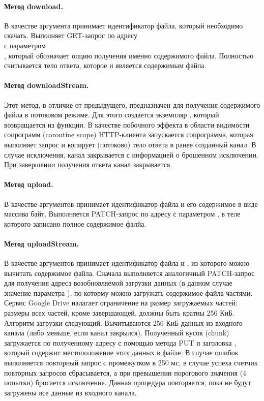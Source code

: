         \paragraph{Метод download.} В качестве аргумента принимает идентификатор файла, который необходимо скачать. Выполняет GET-запрос по адресу\\  с параметром\\ , который обозначает опцию получения именно содержимого файла. Полностью считывается тело ответа, которое и является содержимым файла.

        \paragraph{Метод downloadStream.} Этот метод, в отличие от предыдущего, предназначен для получения содержимого файла в потоковом режиме. Для этого создается экземпляр , который возвращается из функции. В качестве побочного эффекта в области видимости сопрограмм (coroutine scope) HTTP-клиента запускается сопрограмма, которая выполняет запрос и копирует (потоково) тело ответа в ранее созданный канал. В случае исключения, канал закрывается с информацией о брошенном исключении. При завершении получения ответа канал закрывается.

        \paragraph{Метод upload.} В качестве аргументов принимает идентификатор файла и его содержимое в виде массива байт. Выполняется PATCH-запрос по адресу  с параметром , в теле которого записано полное содержимое фалйа.

        \paragraph{Метод uploadStream.} В качестве аргументов принимает идентификатор файла и , из которого можно вычитать содержимое файла. Сначала выполняется аналогичный PATCH-запрос для получения адреса возобновляемой загрузки данных (в данном случае значение параметра ), по которму можно загружать содержимое файла частями. Сервис Google Drive налагает ограничение на размер загружаемых частей: размеры всех частей, кроме завершающей, должны быть кратны 256 КиБ. Алгоритм загрузки следующий. Вычитываются 256 КиБ данных из входного канала (либо меньше, если канал закрылся). Полученный кусок (chunk) загружается по полученному адресу с помощью метода PUT и заголовка , который содержит местоположение этих данных в файле. В случае ошибок выполняется повторный запрос с промежутком в 250 мс, в случае успеха счетчик повторных запросов сбрасывается, а при превышении порогового значения (4 попытки) бросается исключение. Данная процедура повторяется, пока не будут загружены все данные из входного канала.


